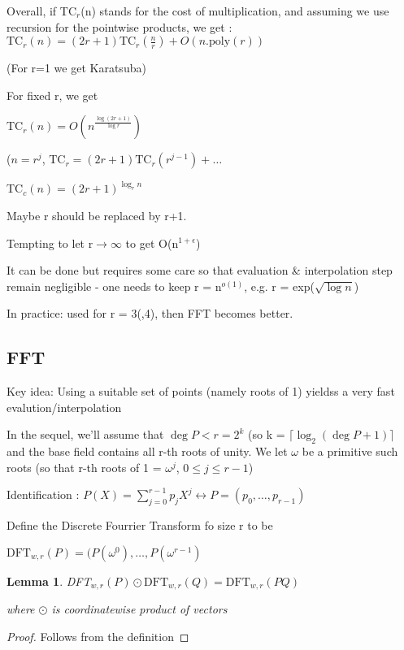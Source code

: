 \documentclass{article}
\newtheorem{lemma}{Lemma}
\theoremstyle{definition}
\theoremstyle{remark}
\begin{document}
Overall, if TC$_r$(n) stands for the cost of multiplication, and assuming we use recursion for the pointwise products, we get :
$\text{TC}_r(n) = (2r+1)\text{TC}_r(\frac{n}{r})+O(n.\text{poly}(r))$

(For r=1 we get Karatsuba)

For fixed r, we get

$\text{TC}_r(n) = O(n^{\frac{\log(2r+1)}{\log r}})$

($n=r^j$, $\text{TC}_r=(2r+1)\text{TC}_r(r^{j-1})+\dots$

TC$_c(n) = (2r+1)^{\log_{r}n}$

Maybe r should be replaced by r+1.

Tempting to let r$\rightarrow\infty$ to get O(n$^{1+\epsilon}$)

It can be done but requires some care so that evaluation \& interpolation step remain negligible - one needs to keep r = n$^{o(1)}$, e.g. r = exp($\sqrt{\log n}$)

In practice: used for r = 3(,4), then FFT becomes better.

\subsection{FFT}
Key idea: Using a suitable set of points (namely roots of 1) yieldss a very fast evalution/interpolation

In the sequel, we'll assume that
$\deg P < r = 2^k$ (so k = $\lceil \log_2(\deg P + 1)\rceil$ and the base field contains all r-th roots of unity. We let $\omega$ be a primitive such roots (so that {r-th roots of 1} = {$\omega^j$, $0\leq j \leq r-1$})

Identification :
$P(X) = \sum_{j=0}^{r-1} p_j X^j \longleftrightarrow P = (p_0,\dots,p_{r-1})$

Define the Discrete Fourrier Transform fo size r to be

$\text{DFT}_{w,r}(P) = (P(\omega^0),\dots,P(\omega^{r-1})$

\begin{lemma}
	DFT$_{w,r}(P) \odot \text{DFT}_{w,r}(Q) = \text{DFT}_{w,r}(PQ)$
	
	where $\odot$ is coordinatewise product of vectors
\end{lemma}

\begin{proof}
	Follows from the definition
\end{proof}
\end{document}
